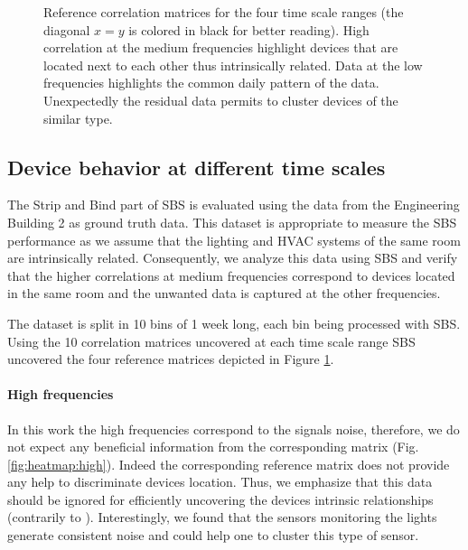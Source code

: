 \begin{figure}[t!]
\caption{Reference correlation matrices for the four time scale ranges (the diagonal $x=y$ is colored in black for better reading). High correlation at the medium frequencies highlight devices that are located next to each other thus intrinsically related. Data at the low frequencies highlights the common daily pattern of the data. Unexpectedly the residual data permits to cluster devices of the similar type.}
\label{fig:heatmap}
\end{figure}

\subsection{Device behavior at different time scales}
The Strip and Bind part of SBS is evaluated using the data from the Engineering Building 2 as ground truth data.
This dataset is appropriate to measure the SBS performance as we assume that the lighting and HVAC systems of the same room are intrinsically related.
Consequently, we analyze this data using SBS and verify that the higher correlations at medium frequencies correspond to devices located in the same room and the unwanted data is captured at the other frequencies.

The dataset is split in 10 bins of 1 week long, each bin being processed with SBS.
Using the 10 correlation matrices uncovered at each time scale range SBS uncovered the four reference matrices depicted in Figure \ref{fig:heatmap}.

\paragraph{High frequencies}
In this work the high frequencies correspond to the signals noise, therefore, we do not expect any beneficial information from the corresponding matrix (Fig. \ref{fig:heatmap:high}).
Indeed the corresponding reference matrix does not provide any help to discriminate devices location.
Thus, we emphasize that this data should be ignored for efficiently uncovering the devices intrinsic relationships (contrarily to \cite{romain:iotapp12}).
Interestingly, we found that the sensors monitoring the lights generate consistent noise and could help one to cluster this type of sensor.
  

